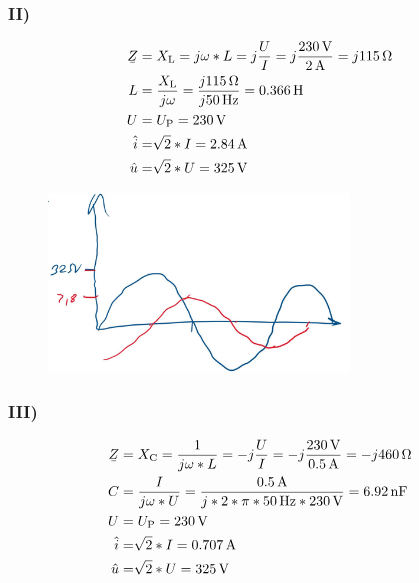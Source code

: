 \documentclass[../../document.tex]{subfiles}
\begin{document}
\subsubsection*{II)}

\begin{equation*}
    \begin{split}
        \ubar{Z} &= X\cind{L} = j \omega * L = j \frac{U}{I} = j \frac{\SI{230}{\volt}}{\SI{2}{\ampere}} = j \SI{115}{\ohm}\\
        L &= \frac{X\cind{L}}{j\omega} = \frac{j \SI{115}{\ohm}}{j \SI{50}{\hertz}} = \SI{0,366}{\henry}\\
        U &= U\cind{P} = \SI{230}{\volt}\\
        \hat{i} &= \sqrt[]{2} * I = \SI{2,84}{\ampere}\\
        \hat{u} &= \sqrt[]{2} * U = \SI{325}{\volt}\\
    \end{split}
\end{equation*}

\begin{figure}[H]
    \begin{center}
        \includegraphics[width=8cm]{../../img/task1-a-ii.jpeg}
    \end{center}
\end{figure}

\subsubsection*{III)}

\begin{equation*}
    \begin{split}
        \ubar{Z} &= X\cind{C} = \frac{1}{j \omega * L} = -j \frac{U}{I} = -j \frac{\SI{230}{\volt}}{\SI{0,5}{\ampere}} = -j \SI{460}{\ohm}\\
        C &= \frac{I}{j\omega * U} = \frac{\SI{0,5}{\ampere}}{j * 2 * \pi * \SI{50}{\hertz} * \SI{230}{\volt}} = \SI{6,92}{\nano\farad}\\
        U &= U\cind{P} = \SI{230}{\volt}\\
        \hat{i} &= \sqrt[]{2} * I = \SI{0,707}{\ampere}\\
        \hat{u} &= \sqrt[]{2} * U = \SI{325}{\volt}\\
    \end{split}
\end{equation*}
\end{document}
